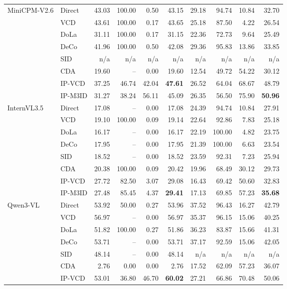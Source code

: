 \begin{table}[t]
\begin{tabular}{llrrrr@{\hspace{11pt}}rrrr}
\addlinespace[3pt]
MiniCPM-V2.6 & Direct & 43.03 & 100.00 & 0.50 & 43.15 & 29.18 & 94.74 & 10.84 & 32.70\\
 & VCD & 43.61 & 100.00 & 0.17 & 43.65 & 25.18 & 87.50 & 4.22 & 26.54\\
 & DoLa & 31.11 & 100.00 & 0.17 & 31.15 & 22.36 & 72.73 & 9.64 & 25.49\\
 & DeCo & 41.96 & 100.00 & 0.50 & 42.08 & 29.36 & 95.83 & 13.86 & 33.85\\
 & SID & n/a & n/a & n/a & n/a & n/a & n/a & n/a & n/a\\
 & CDA & 19.60 & -- & 0.00 & 19.60 & 12.54 & 49.72 & 54.22 & 30.12\\
 & IP-VCD & 37.25 & 46.74 & 42.04 & \textbf{47.61} & 26.52 & 64.04 & 68.67 & 48.79\\
 & IP-M3ID & 31.27 & 38.24 & 56.11 & 45.09 & 26.35 & 56.50 & 75.90 & \textbf{50.96}\\
\addlinespace[3pt]
InternVL3.5 & Direct & 17.08 & -- & 0.00 & 17.08 & 24.39 & 94.74 & 10.84 & 27.91\\
 & VCD & 19.10 & 100.00 & 0.09 & 19.14 & 22.64 & 92.86 & 7.83 & 25.18\\
 & DoLa & 16.17 & -- & 0.00 & 16.17 & 22.19 & 100.00 & 4.82 & 23.75\\
 & DeCo & 17.95 & -- & 0.00 & 17.95 & 21.39 & 100.00 & 6.63 & 23.54\\
 & SID & 18.52 & -- & 0.00 & 18.52 & 23.59 & 92.31 & 7.23 & 25.94\\
 & CDA & 20.38 & 100.00 & 0.09 & 20.42 & 19.96 & 68.49 & 30.12 & 29.73\\
 & IP-VCD & 27.72 & 82.50 & 3.07 & 29.08 & 16.43 & 69.42 & 50.60 & 32.83\\
 & IP-M3ID & 27.48 & 85.45 & 4.37 & \textbf{29.41} & 17.13 & 69.85 & 57.23 & \textbf{35.68}\\
\addlinespace[3pt]
Qwen3-VL & Direct & 53.92 & 50.00 & 0.27 & 53.96 & 37.52 & 96.43 & 16.27 & 42.79\\
 & VCD & 56.97 & -- & 0.00 & 56.97 & 35.37 & 96.15 & 15.06 & 40.25\\
 & DoLa & 51.82 & 100.00 & 0.27 & 51.86 & 36.23 & 83.87 & 15.66 & 41.31\\
 & DeCo & 53.71 & -- & 0.00 & 53.71 & 37.17 & 92.59 & 15.06 & 42.05\\
 & SID & 48.14 & -- & 0.00 & 48.14 & n/a & n/a & n/a & n/a\\
 & CDA & 2.76 & 0.00 & 0.00 & 2.76 & 17.52 & 62.09 & 57.23 & 36.07\\
 & IP-VCD & 53.01 & 36.80 & 46.70 & \textbf{60.02} & 27.21 & 66.86 & 70.48 & 50.06\\

\end{tabular}
\end{table}
